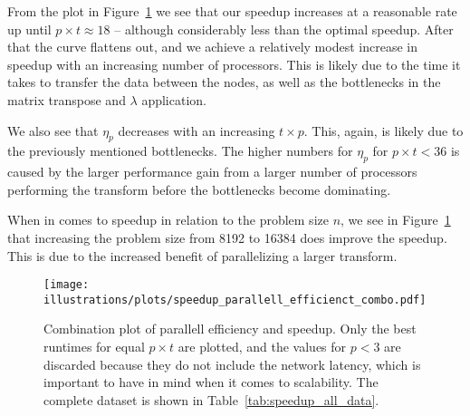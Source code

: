 From the plot in Figure~\ref{fig:plot_pe_sp} we see that our speedup increases at a reasonable rate up until $p\times t \approx 18$ -- although considerably less than the optimal speedup. After that the curve flattens out, and we achieve a relatively modest increase in speedup with an increasing number of processors. This is likely due to the time it takes to transfer the data between the nodes, as well as the bottlenecks in the matrix transpose and $\lambda$ application.

We also see that $\eta_p$ decreases with an increasing $t\times p$. This, again, is likely due to the previously mentioned bottlenecks. The higher numbers for $\eta_p$ for $p\times t < 36$ is caused by the larger performance gain from a larger number of processors performing the transform before the bottlenecks become dominating.

When in comes to speedup in relation to the problem size $n$, we see in Figure~\ref{fig:plot_pe_sp} that increasing the problem size from 8192 to 16384 does improve the speedup. This is due to the increased benefit of parallelizing a larger transform.


\begin{figure}[htbp]
  \centering
  \texttt{[image: illustrations/plots/speedup\_parallell\_efficienct\_combo.pdf]}
  \caption{Combination plot of parallell efficiency and speedup. Only the best runtimes for equal $p\times t$ are plotted, and the values for $p<3$ are discarded because they do not include the network latency, which is important to have in mind when it comes to scalability. The complete dataset is shown in Table~\ref{tab:speedup_all_data}.}
  \label{fig:plot_pe_sp}
\end{figure}

